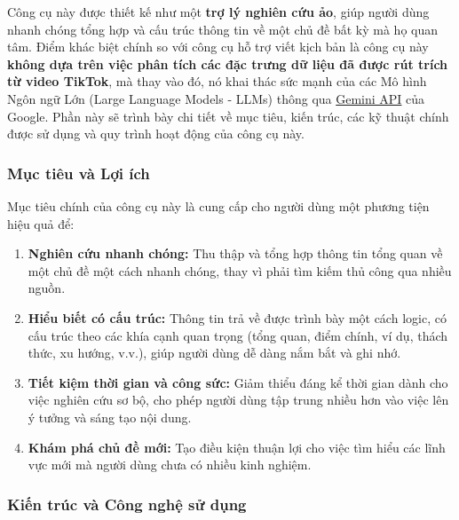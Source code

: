 Công cụ này được thiết kế như một \textbf{trợ lý nghiên cứu ảo}, giúp người dùng nhanh chóng tổng hợp và cấu trúc thông tin về một chủ đề bất kỳ mà họ quan tâm. Điểm khác biệt chính so với công cụ hỗ trợ viết kịch bản là công cụ này \textbf{không dựa trên việc phân tích các đặc trưng dữ liệu đã được rút trích từ video TikTok}, mà thay vào đó, nó khai thác sức mạnh của các Mô hình Ngôn ngữ Lớn (Large Language Models - LLMs) thông qua \href{https://ai.google.dev/}{Gemini API} của Google. Phần này sẽ trình bày chi tiết về mục tiêu, kiến trúc, các kỹ thuật chính được sử dụng và quy trình hoạt động của công cụ này.

\subsubsection{Mục tiêu và Lợi ích}

\noindent
Mục tiêu chính của công cụ này là cung cấp cho người dùng một phương tiện hiệu quả để:
\begin{enumerate}
    \item \textbf{Nghiên cứu nhanh chóng:} Thu thập và tổng hợp thông tin tổng quan về một chủ đề một cách nhanh chóng, thay vì phải tìm kiếm thủ công qua nhiều nguồn.
    
    \item \textbf{Hiểu biết có cấu trúc:} Thông tin trả về được trình bày một cách logic, có cấu trúc theo các khía cạnh quan trọng (tổng quan, điểm chính, ví dụ, thách thức, xu hướng, v.v.), giúp người dùng dễ dàng nắm bắt và ghi nhớ.
    
    \item \textbf{Tiết kiệm thời gian và công sức:} Giảm thiểu đáng kể thời gian dành cho việc nghiên cứu sơ bộ, cho phép người dùng tập trung nhiều hơn vào việc lên ý tưởng và sáng tạo nội dung.
    
    \item \textbf{Khám phá chủ đề mới:} Tạo điều kiện thuận lợi cho việc tìm hiểu các lĩnh vực mới mà người dùng chưa có nhiều kinh nghiệm.
\end{enumerate}

\subsubsection{Kiến trúc và Công nghệ sử dụng}

